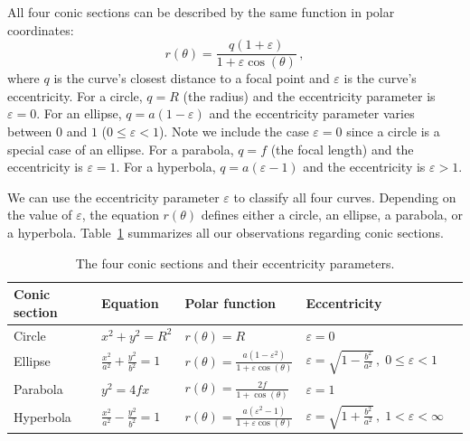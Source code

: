 		All four conic sections can be described by the same function in polar coordinates:					
		\[
		  r(\theta) = \frac{q(1+\varepsilon)}{1 + \varepsilon\cos(\theta)}\,,
		\]
		where $q$ is the curve's closest distance to a focal point
		and $\varepsilon$ is the curve's eccentricity.												
		For a circle, $q=R$ (the radius) and the eccentricity parameter is $\varepsilon=0$.
		For an ellipse, $q=a(1-\varepsilon)$ and the eccentricity parameter varies between $0$ and $1$ ($0\leq \varepsilon < 1$).
		Note we include the case $\varepsilon=0$ since a circle is a special case of an ellipse.
		For a parabola, $q=f$ (the focal length) and the eccentricity is $\varepsilon=1$.
		For a hyperbola, $q = a(\varepsilon-1)$ and the eccentricity is $\varepsilon>1$.

		We can use the eccentricity parameter $\varepsilon$ to classify all four curves.
		Depending on the value of $\varepsilon$,
		the equation $r(\theta)$ defines either a circle, an ellipse, a parabola, or a hyperbola.	
		Table~\ref{table:conics} summarizes all our observations regarding conic sections.


		\begin{table}[htb]
		{ \small

		\centering 
		\begin{longtable}{@{}lllll@{}} 
		\toprule
		Conic section 	\! 	&  Equation  	\!\!					
		& Polar function	
		&	Eccentricity \!\!\!\!\!\!\!\!\!\!\!\!				\\
		\midrule
		Circle				& $x^2+y^2=R^2$ \; 					& $r(\theta)=R$			& $\varepsilon = 0$								\\[1mm]
		Ellipse				& $\frac{x^2}{a^2}+\frac{y^2}{b^2}=1$	& $r(\theta)=\frac{a(1-\varepsilon^2)}{1 + \varepsilon\cos(\theta)}$ &	$\varepsilon\!=\!\sqrt{1\!-\!\frac{b^2}{a^2}}\,, \; 0\!\leq\!\varepsilon\!<\!1$\!\!	\\[2mm]
		Parabola				& $y^2=4fx$						& $r(\theta)=\frac{2f}{1 + \cos(\theta)}$ &	$\varepsilon=1$			 						\\[1mm]
		Hyperbola			& $\frac{x^2}{a^2}-\frac{y^2}{b^2}=1$	& $r(\theta)=\frac{a(\varepsilon^2-1)}{1 + \varepsilon\cos(\theta)}$ &	$\varepsilon\!=\!\sqrt{1\!+\!\frac{b^2}{a^2}}\,, \; 1\!<\!\varepsilon\!<\!\infty$ \\[1mm]
		\bottomrule
		\end{longtable}

		}
		\vspace{4mm}
		\caption{The four conic sections and their eccentricity parameters. }
		\label{table:conics}
		\end{table}


